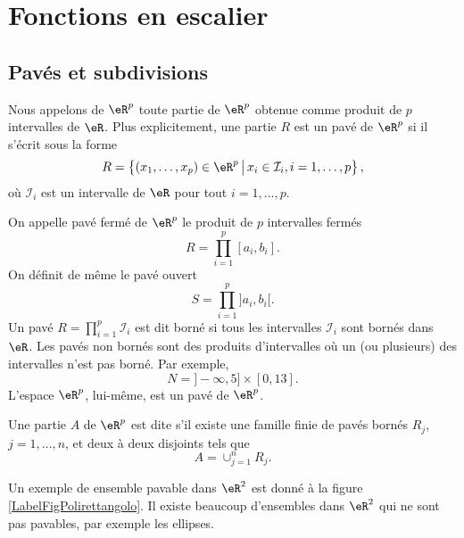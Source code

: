 \section{Fonctions en escalier}

\subsection{Pavés et subdivisions}

\begin{definition}
 Nous appelons  de $\eR^p$ toute partie de $\eR^p$ obtenue comme produit de $p$ intervalles de $\eR$. Plus explicitement, une partie $R$ est un pavé de $\eR^p$ si il s'écrit sous la forme
\[
R=\left\{(x_1,\ldots, x_p)\in\eR^p \,\big\vert\,x_i\in \mathcal{I}_i,  i=1,\ldots, p  \right\},
\]
où $\mathcal{I}_i$ est un intervalle de $\eR$ pour tout $i=1,\ldots, p$. 
\end{definition}
On appelle pavé fermé de $\eR^p$ le produit de $p$ intervalles fermés 
\[
R=\prod_{i=1}^{p}[a_i,b_i].
\]
On définit de même le pavé ouvert 
\[
S=\prod_{i=1}^{p}]a_i,b_i[.
\]
Un pavé $ R=\prod_{i=1}^{p}\mathcal{I}_i$ est dit borné si tous les intervalles $\mathcal{I}_i$ sont bornés dans $\eR$. Les pavés non bornés sont des produits d'intervalles où un (ou plusieurs) des intervalles n'est pas borné. Par exemple,
\[
N=]-\infty, 5]\times [0,13].
\]
L'espace $\eR^p$, lui-même, est un pavé de $\eR^p$. 
\begin{definition}
  Une partie $A$ de $\eR^p$ est dite   s'il existe une famille finie de pavés bornés $R_j$, $j=1,\ldots, n$, et deux à deux disjoints tels que 
\[
A=\cup_{j=1}^{n}R_j.
\] 
\end{definition}
Un exemple de ensemble pavable dans $\eR^2$ est donné à la figure \ref{LabelFigPolirettangolo}. Il existe beaucoup d'ensembles dans $\eR^2$ qui ne sont pas pavables, par exemple les ellipses.
\newcommand{\CaptionFigPolirettangolo}{Un ensemble pavable.}


